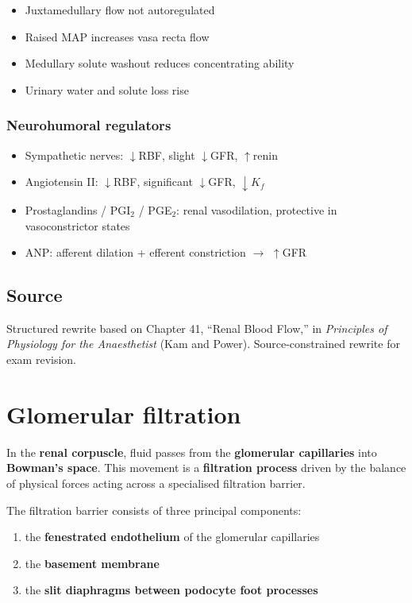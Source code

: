 \documentclass[11pt,a4paper]{article}
\begin{document}
\begin{itemize}
    \item Juxtamedullary flow not autoregulated
    \item Raised MAP increases vasa recta flow
    \item Medullary solute washout reduces concentrating ability
    \item Urinary water and solute loss rise
\end{itemize}

\subsubsection{Neurohumoral regulators}

\begin{itemize}
    \item Sympathetic nerves: $\downarrow$RBF, slight $\downarrow$GFR, $\uparrow$renin
    \item Angiotensin II: $\downarrow$RBF, significant $\downarrow$GFR, $\downarrow K_f$
    \item Prostaglandins / PGI$_2$ / PGE$_2$: renal vasodilation, protective in vasoconstrictor states
    \item ANP: afferent dilation + efferent constriction $\rightarrow$ $\uparrow$GFR
\end{itemize}

\subsection{Source}

Structured rewrite based on Chapter 41, ``Renal Blood Flow,'' in \textit{Principles of Physiology for the Anaesthetist} (Kam and Power). Source-constrained rewrite for exam revision.

\section{Glomerular filtration}

In the \textbf{renal corpuscle}, fluid passes from the \textbf{glomerular capillaries} into \textbf{Bowman’s space}. This movement is a \textbf{filtration process} driven by the balance of physical forces acting across a specialised filtration barrier.

The filtration barrier consists of three principal components:
\begin{enumerate}
    \item the \textbf{fenestrated endothelium} of the glomerular capillaries
    \item the \textbf{basement membrane}
    \item the \textbf{slit diaphragms between podocyte foot processes}
\end{enumerate}
\end{document}
